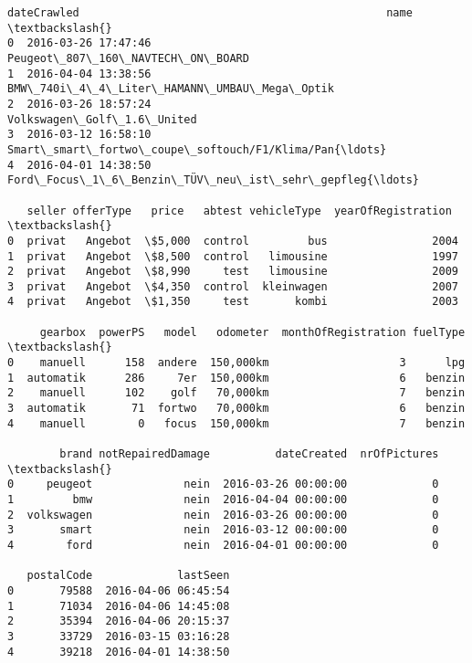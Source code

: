 \documentclass[11pt]{article}
\makeatletter
\newcommand{\boxspacing}{\kern\kvtcb@left@rule\kern\kvtcb@boxsep}
\newcommand{\prompt}[4]{
        {\ttfamily\llap{{\color{#2}[#3]:\hspace{3pt}#4}}\vspace{-\baselineskip}}
    }
\makeatother
\begin{document}
            \begin{tcolorbox}[breakable, size=fbox, boxrule=.5pt, pad at break*=1mm, opacityfill=0]
\prompt{Out}{outcolor}{2}{\boxspacing}
\begin{Verbatim}[commandchars=\\\{\}]
           dateCrawled                                               name  \textbackslash{}
0  2016-03-26 17:47:46                   Peugeot\_807\_160\_NAVTECH\_ON\_BOARD
1  2016-04-04 13:38:56         BMW\_740i\_4\_4\_Liter\_HAMANN\_UMBAU\_Mega\_Optik
2  2016-03-26 18:57:24                         Volkswagen\_Golf\_1.6\_United
3  2016-03-12 16:58:10  Smart\_smart\_fortwo\_coupe\_softouch/F1/Klima/Pan{\ldots}
4  2016-04-01 14:38:50  Ford\_Focus\_1\_6\_Benzin\_TÜV\_neu\_ist\_sehr\_gepfleg{\ldots}

   seller offerType   price   abtest vehicleType  yearOfRegistration  \textbackslash{}
0  privat   Angebot  \$5,000  control         bus                2004
1  privat   Angebot  \$8,500  control   limousine                1997
2  privat   Angebot  \$8,990     test   limousine                2009
3  privat   Angebot  \$4,350  control  kleinwagen                2007
4  privat   Angebot  \$1,350     test       kombi                2003

     gearbox  powerPS   model   odometer  monthOfRegistration fuelType  \textbackslash{}
0    manuell      158  andere  150,000km                    3      lpg
1  automatik      286     7er  150,000km                    6   benzin
2    manuell      102    golf   70,000km                    7   benzin
3  automatik       71  fortwo   70,000km                    6   benzin
4    manuell        0   focus  150,000km                    7   benzin

        brand notRepairedDamage          dateCreated  nrOfPictures  \textbackslash{}
0     peugeot              nein  2016-03-26 00:00:00             0
1         bmw              nein  2016-04-04 00:00:00             0
2  volkswagen              nein  2016-03-26 00:00:00             0
3       smart              nein  2016-03-12 00:00:00             0
4        ford              nein  2016-04-01 00:00:00             0

   postalCode             lastSeen
0       79588  2016-04-06 06:45:54
1       71034  2016-04-06 14:45:08
2       35394  2016-04-06 20:15:37
3       33729  2016-03-15 03:16:28
4       39218  2016-04-01 14:38:50
\end{Verbatim}
\end{tcolorbox}
        
\end{document}
